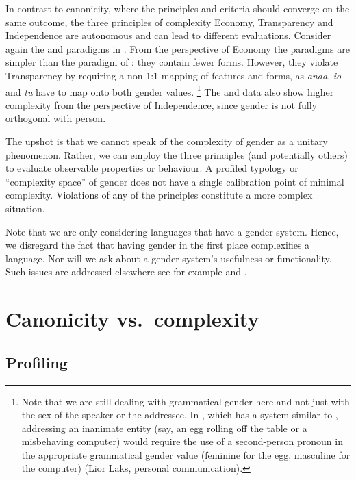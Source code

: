 \documentclass[output=collectionpaper]{langsci/langscibook}
\begin{document}
In contrast to canonicity, where the principles and criteria should converge on the same outcome, the three principles of complexity \textendash{} Economy, Transparency and Independence \textendash{} are autonomous and can lead to different evaluations. Consider again the  and  paradigms in . From the perspective of Economy the paradigms are simpler than the paradigm of : they contain fewer forms. However, they violate Transparency by requiring a non-1:1 mapping of features and forms, as \textit{anaa}, \textit{io} and \textit{tu} have to map onto both gender values.%
\footnote{Note that we are still dealing with grammatical gender here and not just with the sex of the speaker or the addressee. In , which has a system similar to , addressing an inanimate entity (say, an egg rolling off the table or a misbehaving computer) would require the use of a second-person pronoun in the appropriate grammatical gender value (feminine for the egg, masculine for the computer) (Lior Laks, personal communication).} %
The  and  data also show higher complexity from the perspective of Independence, since gender is not fully orthogonal with person.

The upshot is that we cannot speak of the complexity of gender as a unitary phenomenon. Rather, we can employ the three principles (and potentially others) to evaluate observable properties or behaviour. A profiled typology or ``complexity space'' of gender does not have a single calibration point of minimal complexity. Violations of any of the principles constitute a more complex situation.

Note that we are only considering languages that have a gender system. Hence, we disregard the fact that having gender in the first place complexifies a language. Nor will we ask about a gender system's usefulness or functionality. Such issues are addressed elsewhere \textendash{} see for example  and .

\section{Canonicity vs.\ complexity}
\label{sec:Audr:3}

\subsection{Profiling}
\end{document}
